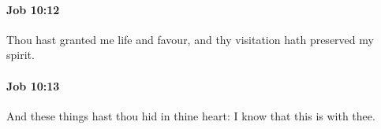 		\paragraph{Job 10:12} %
			\label{JOB-10-12}

			Thou hast granted me life and favour, and thy visitation hath preserved my spirit.


		\paragraph{Job 10:13} %
			\label{JOB-10-13}

			And these things hast thou hid in thine heart: I know that this is with thee.


